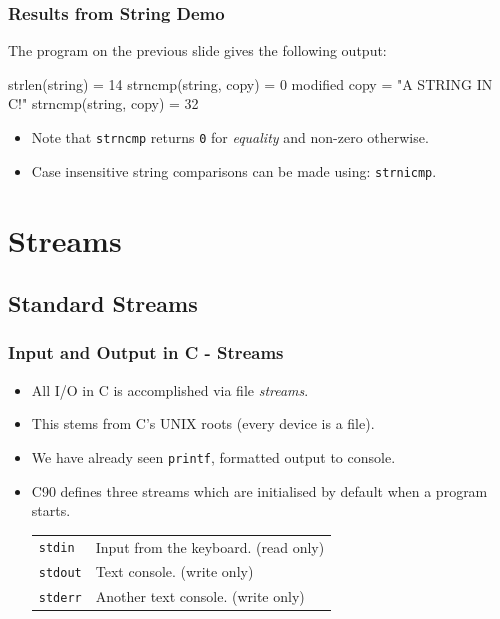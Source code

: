 \documentclass[smaller,table]{beamer}
\begin{document}
\begin{frame}[fragile]
\frametitle{Results from String Demo}
The program on the previous slide gives the following output:
\begin{semiverbatim}
strlen(string) = 14
strncmp(string, copy) = 0
modified copy = "A STRING IN C!"
strncmp(string, copy) = 32
\end{semiverbatim}
\begin{itemize}
\item Note that {\tt strncmp} returns {\tt 0} for \emph{equality} and non-zero otherwise.
\item Case insensitive string comparisons can be made using: {\tt strnicmp}.
\end{itemize}
\end{frame}



\section{Streams}
\subsection{Standard Streams}
\begin{frame}
\frametitle{Input and Output in C - Streams}
\begin{itemize}
\item All I/O in C is accomplished via file \emph{streams}.
\item This stems from C's UNIX roots (every device is a file).
\item We have already seen {\tt printf}, formatted output to console.
\item C90 defines three streams which are initialised by default when a program starts.
\begin{center}
\begin{tabular}{l l}
{\tt stdin}&Input from the keyboard. (read only)\\
{\tt stdout}&Text console. (write only)\\
{\tt stderr}&Another text console. (write only)
\end{tabular}
\end{center}
\end{itemize}
\end{frame}
\end{document}
